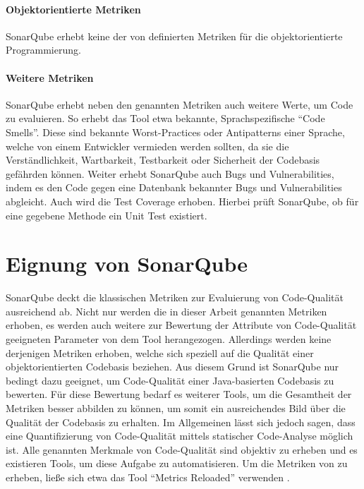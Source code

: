 \documentclass[a4paper, 12pt]{article}
\begin{document}
\paragraph{Objektorientierte Metriken}
SonarQube erhebt keine der von \textcite{Metrics_OO_design} definierten Metriken für die objektorientierte Programmierung.

\paragraph{Weitere Metriken}
SonarQube erhebt neben den genannten Metriken auch weitere Werte, um Code zu evaluieren.
So erhebt das Tool etwa bekannte, Sprachspezifische \enquote{Code Smells}.
Diese sind bekannte Worst-Practices oder Antipatterns einer Sprache, welche von einem Entwickler vermieden werden sollten, da sie die Verständlichkeit, Wartbarkeit, Testbarkeit oder Sicherheit der Codebasis gefährden können.
Weiter erhebt SonarQube auch Bugs und Vulnerabilities, indem es den Code gegen eine Datenbank bekannter Bugs und Vulnerabilities abgleicht.
Auch wird die Test Coverage erhoben. Hierbei prüft SonarQube, ob  für eine gegebene Methode ein Unit Test existiert.


\section{Eignung von SonarQube}
SonarQube deckt die klassischen Metriken zur Evaluierung von Code-Qualität ausreichend ab.
Nicht nur werden die in dieser Arbeit genannten Metriken erhoben, es werden auch weitere zur Bewertung der Attribute von Code-Qualität geeigneten Parameter von dem Tool herangezogen.
Allerdings werden keine derjenigen Metriken erhoben, welche sich speziell auf die Qualität einer objektorientierten Codebasis beziehen.
Aus diesem Grund ist SonarQube nur bedingt dazu geeignet, um Code-Qualität einer Java-basierten Codebasis zu bewerten.  
Für diese Bewertung bedarf es weiterer Tools, um die Gesamtheit der Metriken besser abbilden zu können, um somit ein ausreichendes Bild über die Qualität der Codebasis zu erhalten.
Im Allgemeinen lässt sich jedoch sagen, dass eine Quantifizierung von Code-Qualität mittels statischer Code-Analyse möglich ist. 
Alle genannten Merkmale von Code-Qualität sind objektiv zu erheben und es existieren Tools, um diese Aufgabe zu automatisieren.
Um die Metriken von \textcite{Metrics_OO_design} zu erheben, ließe sich etwa das Tool \enquote{Metrics Reloaded} verwenden \parencite{metrics_reloaded}.

\newpage
\printbibliography
\end{document}
